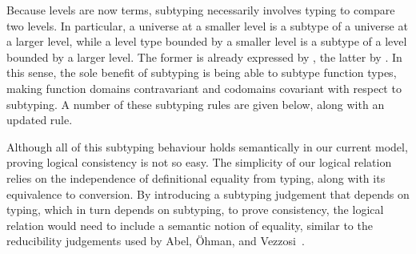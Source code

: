 \documentclass[a4paper,UKenglish,cleveref,autoref,thm-restate]{lipics-v2021}
\newcommand{\citep}[1]{\cite{#1}}
\begin{document}
Because levels are now terms,
subtyping necessarily involves typing to compare two levels.
In particular, a universe at a smaller level is a subtype of a universe at a larger level,
while a level type bounded by a smaller level is a subtype of a level bounded by a larger level.
The former is already expressed by , the latter by .
In this sense, the sole benefit of subtyping is being able to subtype function types,
making function domains contravariant and codomains covariant with respect to subtyping.
A number of these subtyping rules are given below,
along with an updated  rule.
%

Although all of this subtyping behaviour holds semantically in our current model,
proving logical consistency is not so easy.
The simplicity of our logical relation relies on
the independence of definitional equality from typing,
along with its equivalence to conversion.
By introducing a subtyping judgement that depends on typing,
which in turn depends on subtyping, to prove consistency,
the logical relation would need to include a semantic notion of equality,
similar to the reducibility judgements used by Abel, \"Ohman, and Vezzosi~\citep{dec-conv}.
\end{document}
